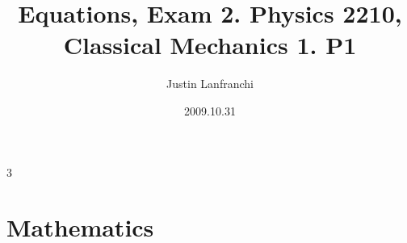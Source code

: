 \documentclass[letterpaper,landscape,10pt]{article}
\title{Equations, Exam 2.  Physics 2210, Classical Mechanics 1. P1}
\author{Justin Lanfranchi}
\date{2009.10.31}
\newif\iftechexplorer\techexplorerfalse
\begin{document}
{
\raggedright

\fontsize{7}{1}\selectfont
\begin{multicols}{3}
\iftechexplorer
  \maketitle
\fi

\section*{Mathematics}




\end{multicols}}
\end{document}
